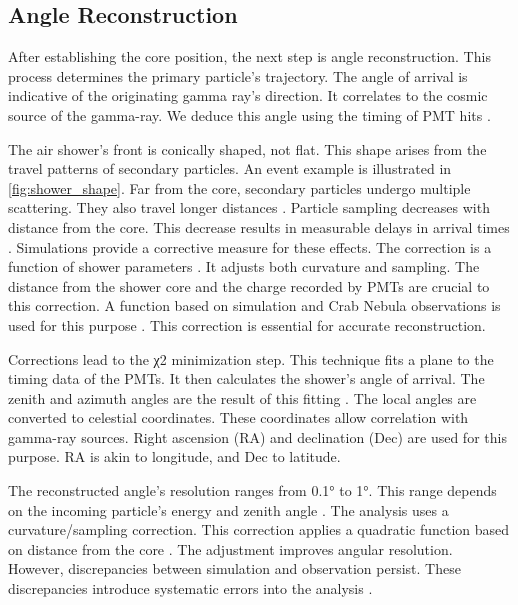 \subsection{Angle Reconstruction}

After establishing the core position, the next step is angle reconstruction.
This process determines the primary particle's trajectory.
The angle of arrival is indicative of the originating gamma ray's direction.
It correlates to the cosmic source of the gamma-ray.
We deduce this angle using the timing of PMT hits \cite{Abeysekara_2017}.

The air shower's front is conically shaped, not flat.
This shape arises from the travel patterns of secondary particles.
An event example is illustrated in \cref{fig:shower_shape}.
Far from the core, secondary particles undergo multiple scattering.
They also travel longer distances \cite{wcd_Sensitivity}.
Particle sampling decreases with distance from the core.
This decrease results in measurable delays in arrival times \cite{wcd_Sensitivity,Abeysekara_2017}.
Simulations provide a corrective measure for these effects.
The correction is a function of shower parameters \cite{Abeysekara_2017}.
It adjusts both curvature and sampling.
The distance from the shower core and the charge recorded by PMTs are crucial to this correction.
A function based on simulation and Crab Nebula observations is used for this purpose \cite{Abeysekara_2017}.
This correction is essential for accurate reconstruction.

Corrections lead to the χ2 minimization step.
This technique fits a plane to the timing data of the PMTs.
It then calculates the shower's angle of arrival.
The zenith and azimuth angles are the result of this fitting \cite{wcd_Sensitivity}.
The local angles are converted to celestial coordinates.
These coordinates allow correlation with gamma-ray sources.
Right ascension (RA) and declination (Dec) are used for this purpose.
RA is akin to longitude, and Dec to latitude.

The reconstructed angle's resolution ranges from 0.1° to 1°.
This range depends on the incoming particle's energy and zenith angle \cite{wcd_Sensitivity}.
The analysis uses a curvature/sampling correction.
This correction applies a quadratic function based on distance from the core \cite{Abeysekara_2017}.
The adjustment improves angular resolution.
However, discrepancies between simulation and observation persist.
These discrepancies introduce systematic errors into the analysis \cite{Abeysekara_2017}.

